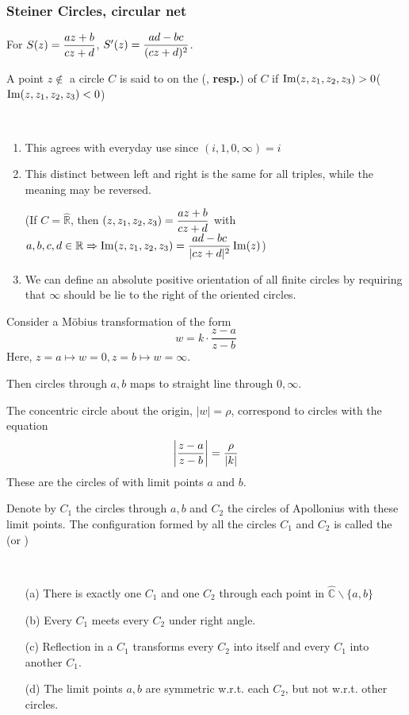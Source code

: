 
\subsubsection{Steiner Circles, circular net}
For  $ S(z)=\displaystyle\frac{az+b}{cz+d} $,  $ S'(z)=\displaystyle\frac{ad-bc }{(cz+d)^2} $.

A point  $ z\not\in  $ a circle  $ C $ is said to on the (, \textbf{resp.}) of  $ C $ if  $ \operatorname{Im}(z,z_1,z_2,z_3)>0 $($ \operatorname{Im}(z,z_1,z_2,z_3)<0 $)

\begin{remark}
    \,
    \begin{enumerate}
        \item This agrees with everyday use since  $ (i,1,0,\infty)=i $ 
        \item This distinct between left and right is the same for all triples, while the meaning may be reversed.
        
        (If  $ C=\hat{\mathbb{R}} $, then  $ (z,z_1,z_2,z_3)=\displaystyle\frac{az+b}{cz+d} $ with  $ a,b,c,d\in\mathbb{R} \Rightarrow \operatorname{Im}(z,z_1,z_2,z_3)=\displaystyle\frac{ad-bc}{|cz+d|^2}\operatorname{Im}(z)$)
        \item We can define an absolute positive orientation of all finite circles by requiring that  $ \infty $ should be lie to the right of the oriented circles. 
    \end{enumerate}
    Consider a M{\"o}bius transformation of the form 
    \[w=k\cdot\frac{z-a}{z-b}\]
    Here,  $ z=a\mapsto w=0,z=b\mapsto w=\infty $.
    
    Then circles through  $ a,b $ maps to straight line through  $ 0,\infty $.
    
    The concentric circle about the origin, $ |w|=\rho $, correspond to circles with the equation 
    \[\displaystyle\left|\frac{z-a}{z-b}\right|=\frac{\rho}{|k|}\]
    These are the circles of  with limit points  $ a $ and  $ b $. 
\end{remark}
Denote by  $ C_1 $ the circles through  $ a,b $ and  $ C_2 $ the circles of Apollonius with these limit points. The configuration formed by all the circles  $ C_1 $ and  $ C_2 $ is called the (or )
\begin{theorem}
    \,
    \begin{enumerate}
        \item[(a)] There is exactly one  $ C_1 $ and one  $ C_2 $ through each point in  $ \hat{\mathbb{C}}\backslash\{a,b\} $
        \item[(b)] Every  $ C_1 $  meets every  $ C_2 $ under right angle.
        \item[(c)] Reflection in a  $ C_1 $ transforms every  $ C_2 $ into itself and every  $ C_1 $ into another  $ C_1 $.
        \item[(d)] The limit points  $ a,b $ are symmetric w.r.t. each  $ C_2 $, but not w.r.t. other circles.     
    \end{enumerate}
\end{theorem}   
